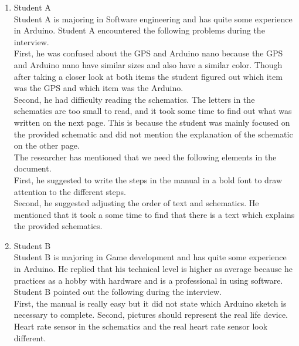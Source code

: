 \documentclass[conference]{IEEEtran}
\begin{document}
\begin{figure*}[ht]
\begin{enumerate}
\begin{enumerate}
\begin{figure*}[!ht]
\begin{enumerate}
\begin{enumerate}
					\item Student A\\
					Student A is majoring in Software engineering and has  quite some experience in Arduino. Student A encountered the following problems during the interview.\\
					First, he was confused about the GPS and Arduino nano because the GPS and Arduino nano have similar sizes and also have a similar color. Though after taking a closer look at both items the student figured out which item was the GPS and which item was the Arduino.\\
					Second, he had difficulty reading the schematics. The letters in the schematics are too small to read, and it took some time to find out what was written on the next page. This is because the student was mainly focused on the provided schematic and did not mention the explanation of the schematic on the other page.\\
					The researcher has mentioned that we need the following elements in the document.\\
					First, he suggested to write the steps in the manual in a bold font to draw attention to the different steps.\\
					Second, he suggested adjusting the order of text and schematics. He mentioned that it took a some time to find that there is a text which explains the provided schematics.
					
					\item Student B\\
					Student B is majoring in Game development and has  quite some experience in Arduino. He replied that his technical level is higher as average because he practices as a hobby with hardware and is a professional in using software. Student B pointed out the following during the interview.\\
					First, the manual is really easy but it did not state which Arduino sketch is necessary to complete.
					Second, pictures should represent the real life device. Heart rate sensor in the schematics and the real heart rate sensor look different.\\


\end{enumerate}
\end{enumerate}
\end{figure*}
\end{enumerate}
\end{enumerate}
\end{figure*}
\end{document}

